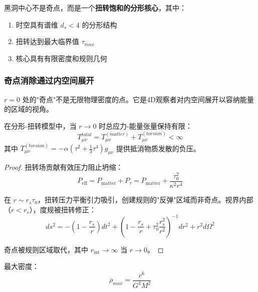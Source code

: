 \begin{hypothesis}[扭转饱和核心]
黑洞中心不是奇点，而是一个\textbf{扭转饱和的分形核心}，其中：
\begin{enumerate}
    \item 时空具有谱维 $d_s < 4$ 的分形结构
    \item 扭转达到最大临界值 $\tau_{max}$
    \item 核心具有有限密度和规则几何
\end{enumerate}
\end{hypothesis}

\subsubsection{奇点消除通过内空间展开}

\begin{insight}[奇点作为视角效应]
$r = 0$ 处的"奇点"不是无限物理密度的点。它是4D观察者对内空间展开以容纳能量的区域的视角。
\end{insight}

\begin{theorem}[规则核心定理]
在分形-扭转模型中，当 $r \to 0$ 时总应力-能量张量保持有限：
\begin{equation}
    T^{total}_{\mu\nu} = T^{(matter)}_{\mu\nu} + T^{(torsion)}_{\mu\nu} < \infty
\end{equation}
其中 $T^{(torsion)}_{\mu\nu} = -\alpha(\tau^2 + \frac{1}{3}\tau^4)g_{\mu\nu}$ 提供抵消物质发散的负压。
\end{theorem}

\begin{proof}
扭转场贡献有效压力阻止坍缩：
\begin{equation}
    P_{\text{eff}} = P_{\text{matter}} + P_{\tau} = P_{\text{matter}} + \frac{\tau_0^2}{\kappa^2 r^4}
\end{equation}

在 $r \sim r_s \tau_0$，扭转压力平衡引力吸引，创建规则的"反弹"区域而非奇点。视界内部（$r < r_s$），度规被扭转修正：
\begin{equation}
    ds^2 = -\left(1 - \frac{r_s}{r}\right)dt^2 + \left(1 - \frac{r_s}{r} + \tau_0^2\frac{r_s^2}{r^2}\right)^{-1}dr^2 + r^2 d\Omega^2
\end{equation}

奇点被规则区域取代，其中 $r_{\text{int}} \to \infty$ 当 $r \to 0$。
\end{proof}

最大密度：
\begin{equation}
    \rho_{max} = \frac{c^6}{G^3M^2}
\end{equation}

